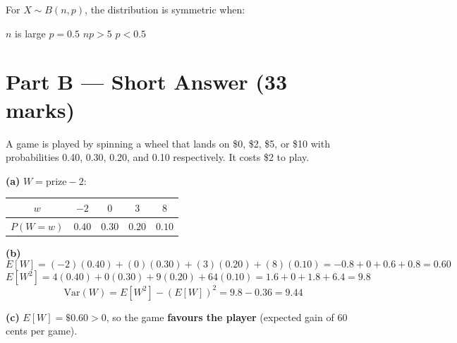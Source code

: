 \documentclass[addpoints]{exam}
\begin{document}
\begin{questions}
\question[1] For $X \sim B(n,p)$, the distribution is symmetric when:
\begin{choices}
    \choice $n$ is large
    \correctchoice $p = 0.5$
    \choice $np > 5$
    \choice $p < 0.5$
\end{choices}


\section*{Part B --- Short Answer (33 marks)}

\question A game is played by spinning a wheel that lands on \$0, \$2, \$5, or \$10
with probabilities 0.40, 0.30, 0.20, and 0.10 respectively. It costs \$2 to play.
\begin{solution}[9cm]
\textbf{(a)} $W = \text{prize} - 2$:

\begin{center}
\begin{tabular}{ccccc}
\toprule
$w$ & $-2$ & $0$ & $3$ & $8$ \\
\midrule
$P(W=w)$ & $0.40$ & $0.30$ & $0.20$ & $0.10$ \\
\bottomrule
\end{tabular}
\end{center}

\textbf{(b)}
\[
E[W] = (-2)(0.40) + (0)(0.30) + (3)(0.20) + (8)(0.10)
= -0.8 + 0 + 0.6 + 0.8 = \mathbf{0.60}
\]
\[
E[W^2] = 4(0.40)+0(0.30)+9(0.20)+64(0.10)
= 1.6+0+1.8+6.4 = 9.8
\]
\[
\text{Var}(W) = E[W^2] - (E[W])^2 = 9.8 - 0.36 = \mathbf{9.44}
\]

\textbf{(c)} $E[W] = \$0.60 > 0$, so the game \textbf{favours the player} (expected gain of 60 cents per game).
\end{solution}


\end{questions}
\end{document}
